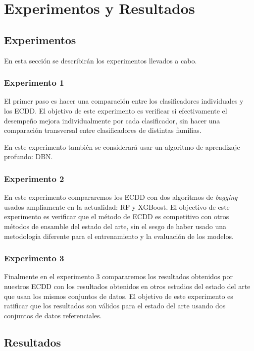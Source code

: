 \chapter{Experimentos y Resultados}


\section{Experimentos}

En esta sección se describirán los experimentos llevados a cabo.

\subsection{Experimento 1}

El primer paso es hacer una comparación entre los clasificadores individuales y los \ac{ECDD}. El objetivo de este experimento es verificar si efectivamente el desempeño mejora individualmente por cada clasificador, sin hacer una comparación transversal entre clasificadores de distintas familias.

En este experimento también se considerará usar un algoritmo de aprendizaje profundo: \ac{DBN}.

\subsection{Experimento 2}

En este experimento compararemos los \ac{ECDD} con dos algoritmos de \textit{bagging} usados ampliamente en la actualidad: \ac{RF} y \ac{XGBoost}. El objectivo de este experimento es verificar que el método de \ac{ECDD} es competitivo con otros métodos de ensamble del estado del arte, sin el sesgo de haber usado una metodología diferente para el entrenamiento y la evaluación de los modelos.

\subsection{Experimento 3}

Finalmente en el experimento 3 compararemos los resultados obtenidos por nuestros \ac{ECDD} con los resultados obtenidos en otros estudios del estado del arte que usan los mismos conjuntos de datos. El objetivo de este experimento es ratificar que los resultados son válidos para el estado del arte usando dos conjuntos de datos referenciales.


\section{Resultados}


